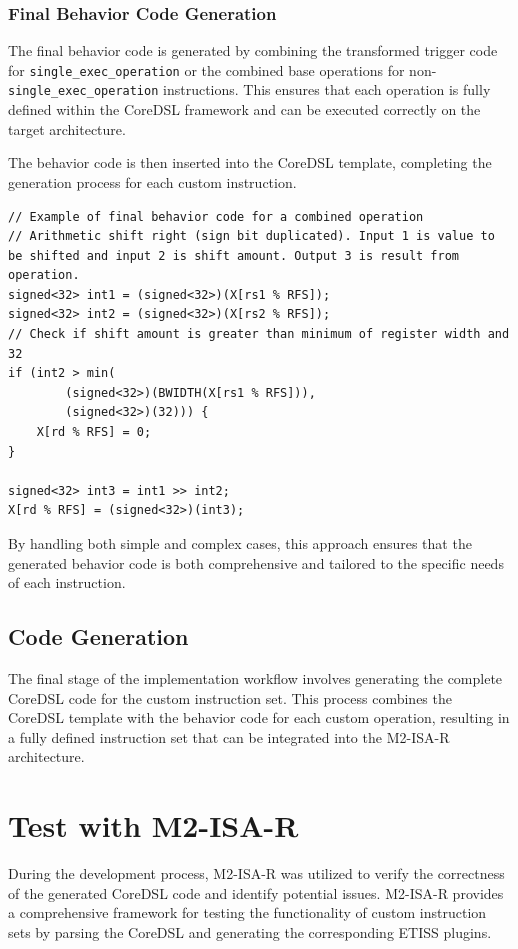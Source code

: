 \subsubsection{Final Behavior Code Generation}

The final behavior code is generated by combining the transformed trigger code for \texttt{single\_exec\_operation} or the combined base operations for non-\texttt{single\_exec\_operation} instructions. This ensures that each operation is fully defined within the CoreDSL framework and can be executed correctly on the target architecture.

The behavior code is then inserted into the CoreDSL template, completing the generation process for each custom instruction.

\begin{lstlisting}
// Example of final behavior code for a combined operation
// Arithmetic shift right (sign bit duplicated). Input 1 is value to be shifted and input 2 is shift amount. Output 3 is result from operation.
signed<32> int1 = (signed<32>)(X[rs1 % RFS]);
signed<32> int2 = (signed<32>)(X[rs2 % RFS]);
// Check if shift amount is greater than minimum of register width and 32
if (int2 > min(
        (signed<32>)(BWIDTH(X[rs1 % RFS])),
        (signed<32>)(32))) {
    X[rd % RFS] = 0;
}

signed<32> int3 = int1 >> int2;
X[rd % RFS] = (signed<32>)(int3);
\end{lstlisting}

By handling both simple and complex cases, this approach ensures that the generated behavior code is both comprehensive and tailored to the specific needs of each instruction.

\subsection{Code Generation}

The final stage of the implementation workflow involves generating the complete CoreDSL code for the custom instruction set. This process combines the CoreDSL template with the behavior code for each custom operation, resulting in a fully defined instruction set that can be integrated into the M2-ISA-R architecture.

\section{Test with M2-ISA-R}

During the development process, M2-ISA-R was utilized to verify the correctness of the generated CoreDSL code and identify potential issues. M2-ISA-R provides a comprehensive framework for testing the functionality of custom instruction sets by parsing the CoreDSL and generating the corresponding ETISS plugins.


